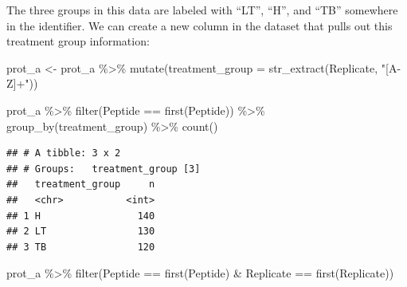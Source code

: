 \documentclass[
]{book}
\newenvironment{Shaded}{\begin{snugshade}}{\end{snugshade}}
\newcommand{\AttributeTok}[1]{\textcolor[rgb]{0.77,0.63,0.00}{#1}}
\newcommand{\FunctionTok}[1]{\textcolor[rgb]{0.00,0.00,0.00}{#1}}
\newcommand{\NormalTok}[1]{#1}
\newcommand{\OtherTok}[1]{\textcolor[rgb]{0.56,0.35,0.01}{#1}}
\newcommand{\SpecialCharTok}[1]{\textcolor[rgb]{0.00,0.00,0.00}{#1}}
\newcommand{\StringTok}[1]{\textcolor[rgb]{0.31,0.60,0.02}{#1}}
\begin{document}
The three groups in this data are labeled with ``LT'', ``H'', and ``TB'' somewhere in
the identifier. We can create a new column in the dataset that pulls out this
treatment group information:

\begin{Shaded}
\begin{Highlighting}[]
\NormalTok{prot\_a }\OtherTok{\textless{}{-}}\NormalTok{ prot\_a }\SpecialCharTok{\%\textgreater{}\%} 
  \FunctionTok{mutate}\NormalTok{(}\AttributeTok{treatment\_group =} \FunctionTok{str\_extract}\NormalTok{(Replicate, }\StringTok{"[A{-}Z]+"}\NormalTok{)) }

\NormalTok{prot\_a }\SpecialCharTok{\%\textgreater{}\%} 
  \FunctionTok{filter}\NormalTok{(Peptide }\SpecialCharTok{==} \FunctionTok{first}\NormalTok{(Peptide)) }\SpecialCharTok{\%\textgreater{}\%} 
  \FunctionTok{group\_by}\NormalTok{(treatment\_group) }\SpecialCharTok{\%\textgreater{}\%} 
  \FunctionTok{count}\NormalTok{()}
\end{Highlighting}
\end{Shaded}

\begin{verbatim}
## # A tibble: 3 x 2
## # Groups:   treatment_group [3]
##   treatment_group     n
##   <chr>           <int>
## 1 H                 140
## 2 LT                130
## 3 TB                120
\end{verbatim}

\begin{Shaded}
\begin{Highlighting}[]
\NormalTok{prot\_a }\SpecialCharTok{\%\textgreater{}\%} 
  \FunctionTok{filter}\NormalTok{(Peptide }\SpecialCharTok{==} \FunctionTok{first}\NormalTok{(Peptide) }\SpecialCharTok{\&} 
\NormalTok{           Replicate }\SpecialCharTok{==} \FunctionTok{first}\NormalTok{(Replicate))}
\end{Highlighting}
\end{Shaded}
\end{document}
